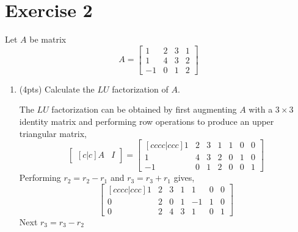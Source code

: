 \section{Exercise 2}
Let $A$ be matrix
\begin{equation}
    A =
    \begin{bmatrix}
        1   &   2   &   3   &   1   \\
        1   &   4   &   3   &   2   \\
        -1   &   0   &   1   &   2
    \end{bmatrix}
\end{equation}
\begin{enumerate}[label=(\alph*)]
    \item (4pts) Calculate the $LU$ factorization of $A$.
        \begin{mdframed}[style=MyFrame]
            The $LU$ factorization can be obtained by first augmenting $A$
            with a $3 \times 3$ identity matrix and performing row
            operations to produce an upper triangular matrix,
            \begin{equation}
                \begin{bmatrix}[c|c]
                    A   &   I
                \end{bmatrix}
                =
                \begin{bmatrix}[cccc|ccc]
                    1   &   2   &   3   &   1   &   1   &   0   &   0   \\
                    1   &   4   &   3   &   2   &   0   &   1   &   0   \\
                    -1  &   0   &   1   &   2   &   0   &   0   &   1   
                \end{bmatrix}
            \end{equation}
            Performing $r_{2} = r_{2}-r_{1}$ and $r_{3} = r_{3} + r_{1}$
            gives,
            \begin{equation}
                \begin{bmatrix}[cccc|ccc]
                    1   &   2   &   3   &   1   &   1   &   0   &   0   \\
                    0   &   2   &   0   &   1   &   -1  &   1   &   0   \\
                    0   &   2   &   4   &   3   &   1   &   0   &   1   
                \end{bmatrix}
            \end{equation}
            Next $r_{3} = r_{3}-r_{2}$
            \begin{equation}

\end{equation}
\end{mdframed}
\end{enumerate}
